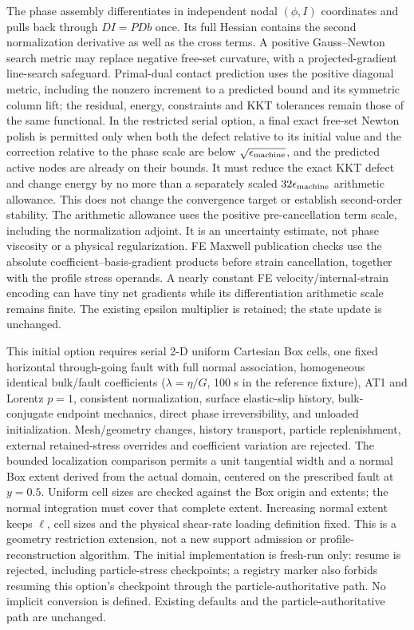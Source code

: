 \documentclass[11pt]{article}
\begin{document}
The phase assembly differentiates in independent nodal $(\phi,I)$ coordinates
and pulls back through $D I=P D b$ once. Its full Hessian contains the second
normalization derivative as well as the cross terms. A positive Gauss--Newton
search metric may replace negative free-set curvature, with a projected-gradient
line-search safeguard. Primal-dual contact prediction uses the positive diagonal
metric, including the nonzero increment to a predicted bound and its symmetric
column lift; the residual, energy, constraints and KKT tolerances
remain those of the same functional. In the restricted serial option, a final
exact free-set Newton polish is permitted only when both the defect relative
to its initial value and the correction relative to the phase scale are below
$\sqrt{\epsilon_{\rm machine}}$, and the predicted active nodes are already
on their bounds. It must reduce the exact KKT defect and change energy by no
more than a separately scaled $32\epsilon_{\rm machine}$ arithmetic allowance.
This does not change the convergence target or establish second-order stability.
The arithmetic allowance uses the positive
pre-cancellation term scale, including the normalization adjoint. It is an
uncertainty estimate, not phase viscosity or a physical regularization.
FE Maxwell publication checks use the absolute coefficient--basis-gradient
products before strain cancellation, together with the profile stress operands.
A nearly constant FE velocity/internal-strain encoding can have tiny net
gradients while its differentiation arithmetic scale remains finite. The
existing epsilon multiplier is retained; the state update is unchanged.

This initial option requires serial 2-D uniform Cartesian Box cells, one fixed
horizontal through-going fault with full normal association, homogeneous identical
bulk/fault coefficients ($\lambda=\eta/G$, 100 s in the reference fixture), AT1
and Lorentz $p=1$, consistent normalization, surface elastic-slip history,
bulk-conjugate endpoint mechanics, direct phase irreversibility, and unloaded
initialization. Mesh/geometry changes, history transport, particle replenishment,
external retained-stress overrides and coefficient variation are rejected.
The bounded localization comparison permits a unit tangential width and a
normal Box extent derived from the actual domain, centered on the prescribed
fault at $y=0.5$. Uniform cell sizes are checked against the Box origin and
extents; the normal integration must cover that complete extent. Increasing
normal extent keeps $\ell$, cell sizes and the physical shear-rate loading
definition fixed. This is a geometry restriction extension, not a new support
admission or profile-reconstruction algorithm.
The initial implementation is fresh-run only: resume is rejected, including
particle-stress checkpoints; a registry marker also forbids resuming this option's
checkpoint through the particle-authoritative path. No implicit conversion is
defined. Existing defaults and the particle-authoritative path are unchanged.
\end{document}
